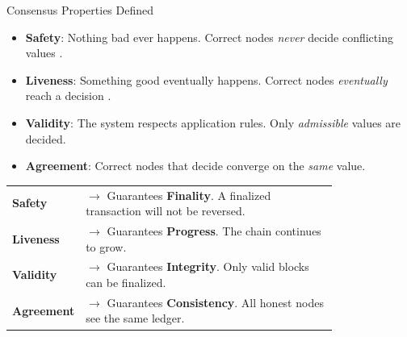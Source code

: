 \documentclass[aspectratio=169]{beamer}
\begin{document}
\begin{frame}{Consensus Properties Defined}
    \begin{itemize}
        \item \textbf{Safety}: Nothing bad ever happens. Correct nodes \textit{never} decide conflicting values \cite{bano_blockchain_2017}.
        \item \textbf{Liveness}: Something good eventually happens. Correct nodes \textit{eventually} reach a decision \cite{bano_blockchain_2017}.
        \item \textbf{Validity}: The system respects application rules. Only \textit{admissible} values are decided.
        \item \textbf{Agreement}: Correct nodes that decide converge on the \textit{same} value.
    \end{itemize}
    \vfill 
    \begin{tcolorbox}[enhanced, colback=white, colframe=usmagray, title={Properties as Guarantees in Blockchains}]
    \small
    \begin{tabular}{lp{0.8\linewidth}}
         \textbf{Safety} & $\rightarrow$ Guarantees \textbf{Finality}. A finalized transaction will not be reversed. \\
         \textbf{Liveness} & $\rightarrow$ Guarantees \textbf{Progress}. The chain continues to grow. \\
         \textbf{Validity} & $\rightarrow$ Guarantees \textbf{Integrity}. Only valid blocks can be finalized. \\
         \textbf{Agreement} & $\rightarrow$ Guarantees \textbf{Consistency}. All honest nodes see the same ledger. \\
    \end{tabular}
    \end{tcolorbox}
\end{frame}
\end{document}
